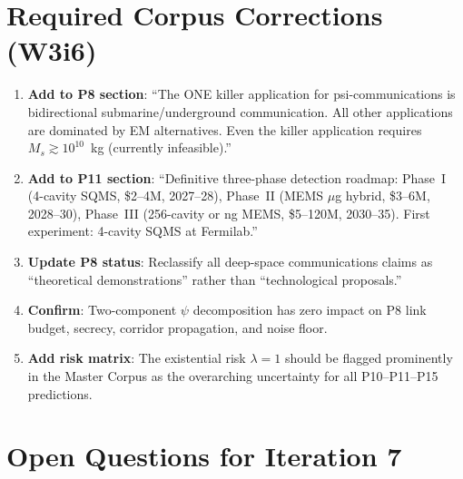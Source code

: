 \documentclass[11pt]{article}
\theoremstyle{definition}
\theoremstyle{remark}
\newcommand{\lam}{\lambda}
\begin{document}
\section{Required Corpus Corrections (W3i6)}
\label{sec:corpus_corrections}

\begin{enumerate}
\item \textbf{Add to P8 section}: ``The ONE killer application for
  psi-communications is bidirectional submarine/underground communication.
  All other applications are dominated by EM alternatives. Even the
  killer application requires $M_s \gtrsim 10^{10}$~kg (currently
  infeasible).''

\item \textbf{Add to P11 section}: ``Definitive three-phase detection
  roadmap: Phase~I (4-cavity SQMS, \$2--4M, 2027--28), Phase~II
  (MEMS $\mu$g hybrid, \$3--6M, 2028--30), Phase~III (256-cavity or
  ng MEMS, \$5--120M, 2030--35). First experiment: 4-cavity SQMS at
  Fermilab.''

\item \textbf{Update P8 status}: Reclassify all deep-space communications
  claims as ``theoretical demonstrations'' rather than ``technological
  proposals.''

\item \textbf{Confirm}: Two-component $\psi$ decomposition has zero impact
  on P8 link budget, secrecy, corridor propagation, and noise floor.

\item \textbf{Add risk matrix}: The existential risk $\lam = 1$ should be
  flagged prominently in the Master Corpus as the overarching uncertainty
  for all P10--P11--P15 predictions.
\end{enumerate}

\section{Open Questions for Iteration 7}
\label{sec:open_questions}
\end{document}
